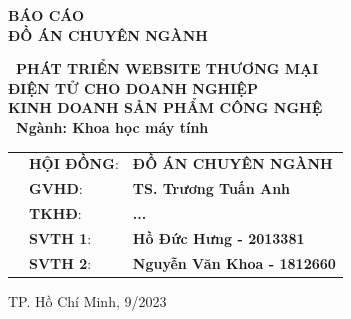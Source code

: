 \begin{titlepage}
\begin{center}
\begin{center}
    \textbf{{\large \textbf{BÁO CÁO}}} \\
    \vspace{0.25cm}
    \textbf{{\large \textbf{ĐỒ ÁN CHUYÊN NGÀNH}}}
\end{center}
\vspace{1cm}
\textbf{{\large \ PHÁT TRIỂN WEBSITE THƯƠNG MẠI \\ ĐIỆN TỬ CHO DOANH NGHIỆP\\ KINH DOANH SẢN PHẨM CÔNG NGHỆ}} \\
\vspace{0.5cm}
\textbf{{\large \ Ngành: Khoa học máy tính}} \\
\end{center}
\vspace{0.7cm}

\begin{table}[h]
\begin{tabular}{lll}

\hspace{2.3 cm} 
& {\large \textbf{HỘI ĐỒNG}}: & \textbf{\large ĐỒ ÁN CHUYÊN NGÀNH}\\
& {\large \textbf{GVHD}}: & \textbf{\large TS. Trương Tuấn Anh}\\
\vspace{0.5cm}
& {\large \textbf{TKHĐ}}: & \textbf{\large ...}\\

& {\large \textbf{SVTH 1}:} &  \textbf{\large Hồ Đức Hưng - 2013381} \\
& {\large \textbf{SVTH 2}:} &  \textbf{\large Nguyễn Văn Khoa - 1812660} \\

\end{tabular}
\end{table}


\vspace{0.5cm}

\begin{center}
{\footnotesize TP. Hồ Chí Minh, 9/2023}
\end{center}
\end{titlepage}
\newpage
